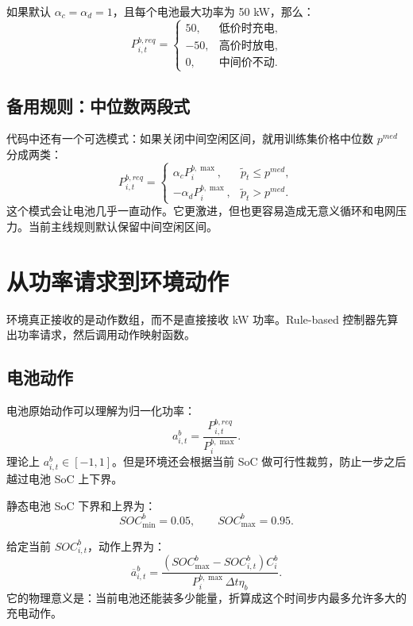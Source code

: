\documentclass[UTF8,zihao=-4]{ctexart}
\begin{document}
如果默认 $\alpha_c=\alpha_d=1$，且每个电池最大功率为 50 kW，那么：
\begin{equation}
P^{b,req}_{i,t}=
\begin{cases}
50, & \text{低价时充电},\\
-50, & \text{高价时放电},\\
0, & \text{中间价不动}.
\end{cases}
\end{equation}

\subsection{备用规则：中位数两段式}

代码中还有一个可选模式：如果关闭中间空闲区间，就用训练集价格中位数 $p^{med}$ 分成两类：
\begin{equation}
P^{b,req}_{i,t}=
\begin{cases}
\alpha_c P^{b,\max}_i, & \tilde p_t\le p^{med},\\
-\alpha_d P^{b,\max}_i, & \tilde p_t>p^{med}.
\end{cases}
\end{equation}
这个模式会让电池几乎一直动作。它更激进，但也更容易造成无意义循环和电网压力。当前主线规则默认保留中间空闲区间。

\section{从功率请求到环境动作}

环境真正接收的是动作数组，而不是直接接收 kW 功率。Rule-based 控制器先算出功率请求，然后调用动作映射函数。

\subsection{电池动作}

电池原始动作可以理解为归一化功率：
\begin{equation}
a^b_{i,t}=\frac{P^{b,req}_{i,t}}{P^{b,\max}_i}.
\end{equation}
理论上 $a^b_{i,t}\in[-1,1]$。但是环境还会根据当前 SoC 做可行性裁剪，防止一步之后越过电池 SoC 上下界。

静态电池 SoC 下界和上界为：
\begin{equation}
SOC^b_{\min}=0.05,\qquad SOC^b_{\max}=0.95.
\end{equation}

给定当前 $SOC^b_{i,t}$，动作上界为：
\begin{equation}
\overline a^b_{i,t}
=\frac{(SOC^b_{\max}-SOC^b_{i,t})C^b_i}
{P^{b,\max}_i\Delta t\eta_b}.
\end{equation}
它的物理意义是：当前电池还能装多少能量，折算成这个时间步内最多允许多大的充电动作。
\end{document}
